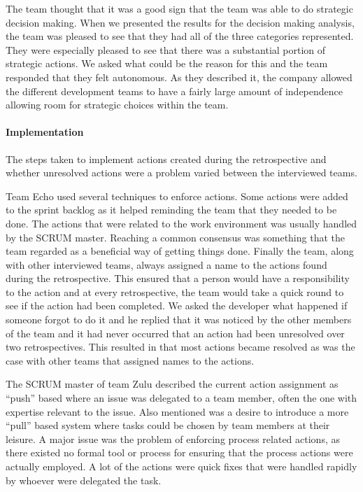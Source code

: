 The team thought that it was a good sign that the team was able to do strategic decision making. When we presented the results for the decision making analysis, the team was pleased to see that they had all of the three categories represented. They were especially pleased to see that there was a substantial portion of strategic actions. We asked what could be the reason for this and the team responded that they felt autonomous. As they described it, the company allowed the different development teams to have a fairly large amount of independence allowing room for strategic choices within the team. 

\paragraph{Implementation}
\label{question-6}
The steps taken to implement actions created during the retrospective and whether unresolved actions were a problem varied between the interviewed teams. 

Team Echo used several techniques to enforce actions. Some actions were added to the sprint backlog as it helped reminding the team that they needed to be done. The actions that were related to the work environment was usually handled by the SCRUM master. Reaching a common consensus was something that the team regarded as a beneficial way of getting things done. Finally the team, along with other interviewed teams, always assigned a name to the actions found during the retrospective. This ensured that a person would have a responsibility to the action and at every retrospective, the team would take a quick round to see if the action had been completed. We asked the developer what happened if someone forgot to do it and he replied that it was noticed by the other members of the team and it had never occurred that an action had been unresolved over two retrospectives. This resulted in that most actions became resolved as was the case with other teams that assigned names to the actions. 

The SCRUM master of team Zulu described the current action assignment as ``push'' based where an issue was delegated to a team member, often the one with expertise relevant to the issue. Also mentioned was a desire to introduce a more ``pull'' based system where tasks could be chosen by team members at their leisure. A major issue was the problem of enforcing process related actions, as there existed no formal tool or process for ensuring that the process actions were actually employed. A lot of the actions were quick fixes that were handled rapidly by whoever were delegated the task.

